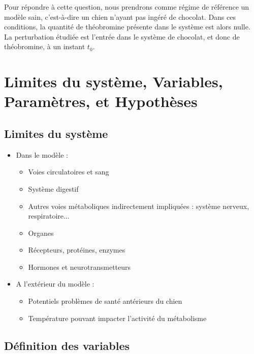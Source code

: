 \documentclass[11pt,a4paper]{article}
\begin{document}
Pour répondre à cette question, nous prendrons comme régime de référence un modèle sain, c'est-à-dire
un chien n'ayant pas ingéré de chocolat. Dans ces conditions, la quantité de théobromine présente
dans le système est alors nulle. La perturbation étudiée est l'entrée dans le système
de chocolat, et donc de théobromine, à un instant $t{_0}$. 



\section{Limites du système, Variables, Paramètres, et Hypothèses}
\label{sec:variables-assumptions}


\subsection{Limites du système}

\begin{itemize}
    \item Dans le modèle :
    \begin{itemize}
        \item {Voies circulatoires et sang}
        \item {Système digestif}
        \item {Autres voies métaboliques indirectement impliquées : système nerveux, respiratoire...}
        \item {Organes}
        \item {Récepteurs, protéines, enzymes}
        \item {Hormones et neurotransmetteurs}
    \end{itemize}

    \item A l'extérieur du modèle :
    \begin{itemize}
        \item {Potentiels problèmes de santé antérieurs du chien}
        \item {Température pouvant impacter l'activité du métabolisme}
    \end{itemize}
\end{itemize}

\subsection{Définition des variables}
\end{document}
